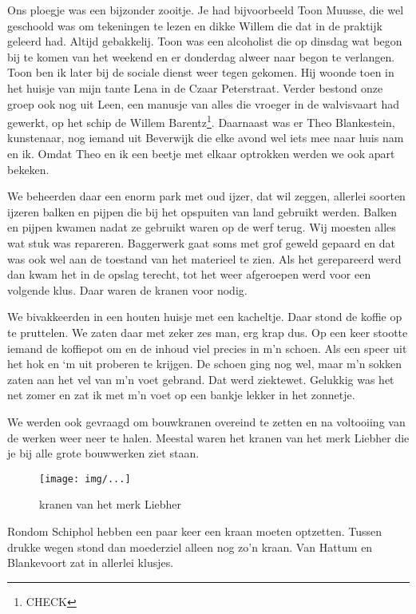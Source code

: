\documentclass[10pt,twoside,openright]{memoir}
\begin{document}
Ons ploegje was een bijzonder zooitje. Je had bijvoorbeeld Toon Muusse, die wel geschoold was om tekeningen te lezen en dikke Willem die dat in de praktijk geleerd had. Altijd gebakkelij. Toon was een alcoholist die op dinsdag wat begon bij te komen van het weekend en er donderdag alweer naar begon te verlangen. Toon ben ik later bij de sociale dienst weer tegen gekomen. Hij woonde toen in het huisje van mijn tante Lena in de Czaar Peterstraat. Verder bestond onze groep ook nog uit Leen, een manusje van alles die vroeger in de walvisvaart had gewerkt, op het schip de Willem Barentz\footnote{CHECK}. Daarnaast was er Theo Blankestein, kunstenaar, nog iemand uit Beverwijk die elke avond wel iets mee naar huis nam en ik. Omdat Theo en ik een beetje met elkaar optrokken werden we ook apart bekeken. 

We beheerden daar een enorm park met oud ijzer, dat wil zeggen, allerlei soorten ijzeren balken en pijpen die bij het opspuiten van land gebruikt werden. Balken en pijpen kwamen nadat ze gebruikt waren op de werf terug. Wij moesten alles wat stuk was repareren. Baggerwerk gaat soms met grof geweld gepaard en dat was ook wel aan de toestand van het materieel te zien. Als het gerepareerd werd dan kwam het in de opslag terecht, tot het weer afgeroepen werd voor een volgende klus. Daar waren de kranen voor nodig. 

We bivakkeerden in een houten huisje met een kacheltje. Daar stond de koffie op te pruttelen. We zaten daar met zeker zes man, erg krap dus. Op een keer stootte iemand de koffiepot om en de inhoud viel precies in m'n schoen. Als een speer uit het hok en `m uit proberen te krijgen. De schoen ging nog wel, maar m'n sokken zaten aan het vel van m'n voet gebrand. Dat werd ziektewet. Gelukkig was het net zomer en zat ik met m'n voet op een bankje lekker in het zonnetje.

We werden ook gevraagd om bouwkranen overeind te zetten en na voltooiing van de werken weer neer te halen. Meestal waren het kranen van het merk Liebher die je bij alle grote bouwwerken ziet staan. 

\begin{figure}[t]
\texttt{[image: img/...]}
\caption{kranen van het merk Liebher}
\end{figure}

Rondom Schiphol hebben een paar keer een kraan moeten optzetten. Tussen drukke wegen stond dan moederziel alleen nog zo’n kraan. Van Hattum en Blankevoort zat in allerlei klusjes.
\end{document}
